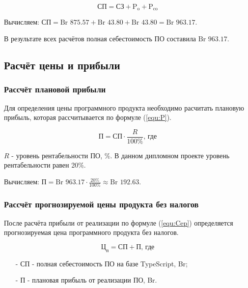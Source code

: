 \begin{equation}
    \label{equ:SP}
    \text{СП} = \text{СЗ} + \text{P}_\text{o} + \text{P}_\text{co}
\end{equation}

Вычисляем: $\text{СП} = \text{Br }875.57 + \text{Br }43.80 + \text{Br }43.80 = \text{Br }963.17$.

В результате всех расчётов полная себестоимость ПО составила $\text{Br }963.17$.

\subsection{Расчёт цены и прибыли}

\subsubsection*{Рассчёт плановой прибыли}

Для определения цены программного продукта необходимо расчитать плановую прибыль, которая рассчитывается по формуле (\ref{equ:P}).

\begin{equation}
    \label{equ:P}
    \text{П} = \text{СП} \cdot \frac{ R }{ 100\% } \text{, где}
\end{equation}

$R$ - уровень рентабельности ПО, \%. В данном дипломном проекте уровень рентабельности равен 20\%.

Вычисляем: $\text{П} = \text{Br }963.17 \cdot \frac{ 20\% }{ 100\% } \approx \text{Br }192.63$.

\subsubsection*{Рассчёт прогнозируемой цены продукта без налогов}

После расчёта прибыли от реализации по формуле (\ref{equ:Cep}) определяется прогнозируемая цена программного продукта без налогов.

\begin{equation}
    \label{equ:Cep}
    \text{Ц}_\text{п} = \text{СП} + \text{П} \text{, где}
\end{equation}

\begin{enumerate}
    \item[-] $\text{СП}$ - полная себестоимость ПО на базе TypeScript, Br;
    \item[-] $\text{П}$ - плановая прибыль от реализации ПО, Br. 
\end{enumerate}

